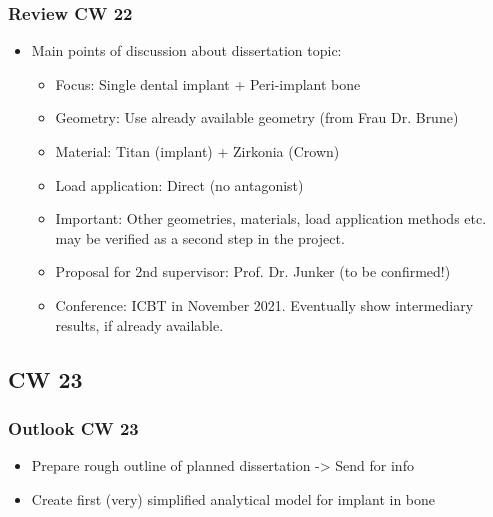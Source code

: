 \begin{frame}
  \frametitle{Review CW 22}
  	\begin{itemize}
		\item Main points of discussion about dissertation topic:
	 	\begin{itemize}
			\item Focus: Single dental implant + Peri-implant bone
			\item Geometry: Use already available geometry (from Frau Dr. 						Brune)
			\item Material: Titan (implant) + Zirkonia (Crown)
			\item Load application: Direct (no antagonist)
			\item Important: Other geometries, materials, load application methods etc. may be verified as a second step in the project.
			\item Proposal for 2nd supervisor: Prof. Dr. Junker (to be confirmed!)
			\item Conference: ICBT in November 2021. Eventually show intermediary results, if already available.
		\end{itemize}
	\end{itemize}
\end{frame}
\subsection{CW 23}
\begin{frame}
  \frametitle{Outlook CW 23}
  \begin{itemize}
		\item Prepare rough outline of planned dissertation -> Send for info
		\item Create first (very) simplified analytical model for implant in bone
	\end{itemize}
\end{frame}


